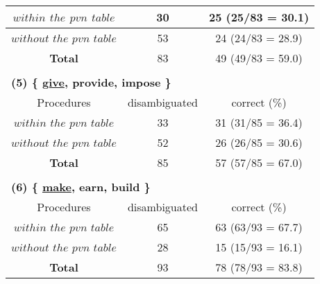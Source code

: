 {\begin{table}[htbp]
\begin{center}
\begin{tabular}{c||c|c}
$within$ $the$ $pvn$ $table$   &\hspace*{1mm}30  &25 (25/83 = 30.1) \\ \hline
$without$ $the$ $pvn$ $table$  &53 &24 (24/83 = 28.9) \\ \hline
{\bf Total} &83 &49 (49/83 = 59.0) \\ \hline
\multicolumn{3}{c}{} \\
\multicolumn{3}{l}{\bf{(5) \{ \underline{give}, provide, impose \}}}
\\ \hline \hline
Procedures &disambiguated &correct (\%) \\ \hline \hline
$within$ $the$ $pvn$ $table$  &\hspace*{1mm}33  &31 (31/85 = 36.4) \\ \hline
$without$ $the$ $pvn$ $table$  &52 &26 (26/85 = 30.6)  \\ \hline
{\bf Total}  &85 &57 (57/85 = 67.0)  \\ \hline
\multicolumn{3}{c}{} \\
\multicolumn{3}{l}{\bf{(6) \{ \underline{make}, earn, build \}}} \\
\hline \hline
Procedures  &disambiguated &correct (\%)  \\ \hline \hline
$within$ $the$ $pvn$ $table$ &\hspace*{1mm}65  &63 (63/93 = 67.7) \\ \hline
$without$ $the$ $pvn$ $table$  &28  &15 (15/93 = 16.1) \\ \hline
{\bf Total} &93 &78 (78/93 = 83.8) \\ \hline
\end{tabular}
\end{center}
\end{table}
}


